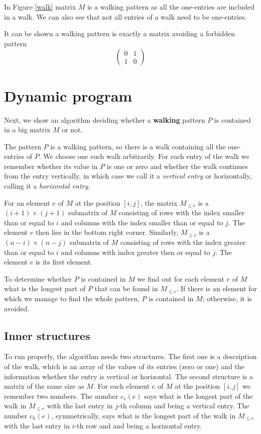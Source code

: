 In Figure \ref{walk} matrix $M$ is a walking pattern as all the one-entries are included in a walk. We can also see that not all entries of a walk need to be one-entries.

It can be shown a walking pattern is exactly a matrix avoiding a forbidden pattern
$$\left(\begin{array}{cc}
0 & 1 \\
1 & 0
\end{array}\right)$$

\section{Dynamic program}
Next, we show an algorithm deciding whether a \textbf{walking} pattern $P$ is contained in a big matrix $M$ or not.

The pattern $P$ is a walking pattern, so there is a walk containing all the one-entries of $P$. We choose one such walk arbitrarily. For each entry of the walk we remember whether its value in $P$ is one or zero and whether the walk continues from the entry vertically, in which case we call it a \emph{vertical entry} or horizontally, calling it a \emph{horizontal entry}.
\begin{defn}
For an element $e$ of $M$ at the position $[i,j]$, the matrix $M_{\leq e}$ is a $(i+1)\times(j+1)$ submatrix of $M$ consisting of rows with the index smaller than or equal to $i$ and columns with the index smaller than or equal to $j$. The element $e$ then lies in the bottom right corner. Similarly, $M_{\geq e}$ is a $(n-i)\times(n-j)$ submatrix of $M$ consisting of rows with the index greater than or equal to $i$ and columns with index greater then or equal to $j$. The element $e$ is its first element.
\end{defn}
To determine whether $P$ is contained in $M$ we find out for each element $e$ of $M$ what is the longest part of $P$ that can be found in $M_{\leq e}$. If there is an element for which we manage to find the whole pattern, $P$ is contained in $M$; otherwise, it is avoided.

\subsection{Inner structures}
To run properly, the algorithm needs two structures. The first one is a description of the walk, which is an array of the values of its entries (zero or one) and the information whether the entry is vertical or horizontal. The second structure is a matrix of the same size as $M$. For each element $e$ of $M$ at the position $[i,j]$ we remember two numbers. The number $c_v(e)$ says what is the longest part of the walk in $M_{\leq e}$ with the last entry in $j$-th column and being a vertical entry. The number $c_h(e)$, symmetrically, says what is the longest part of the walk in $M_{\leq e}$ with the last entry in $i$-th row and and being a horizontal entry.

